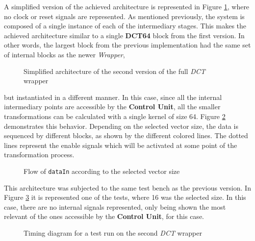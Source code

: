 A simplified version of the achieved architecture is represented in Figure \ref{fig:fullv2}, where no clock or reset signals are represented. As mentioned previously, the system is composed of a single instance of each of the intermediary stages. This makes the achieved architecture similar to a single \textbf{DCT64} block from the first version. In other words, the largest block from the previous implementation had the same set of internal blocks as the newer \emph{Wrapper},

\begin{landscape}
    \vspace*{\fill}
    \begin{figure}[!htbp]
        \centering
        
        \caption{Simplified architecture of the second version of the full \emph{DCT} wrapper}
        \label{fig:fullv2}
    \end{figure}
    \vspace*{\fill}        
\end{landscape}

\noindent
but instantiated in a different manner. In this case, since all the internal intermediary points are accessible by the \textbf{Control Unit}, all the smaller transformations can be calculated with a single kernel of size 64. Figure \ref{fig:v2datapath} demonstrates this behavior. Depending on the selected vector size, the data is sequenced by different blocks, as shown by the different colored lines. The dotted lines represent the enable signals which will be activated at some point of the transformation process.

\begin{figure}[!htbp]
    \centering
    
    \caption{Flow of \texttt{dataIn} according to the selected vector size}
    \label{fig:v2datapath}
\end{figure}

This architecture was subjected to the same test bench as the previous version. In Figure \ref{fig:v2timing} it is represented one of the tests, where 16 was the selected size. In this case, there are no internal signals represented, only being shown the most relevant of the ones accessible by the \textbf{Control Unit}, for this case. 

\begin{figure}[!htbp]
    \centering
    
    \caption{Timing diagram for a test run on the second \emph{DCT} wrapper}
    \label{fig:v2timing}
\end{figure}

